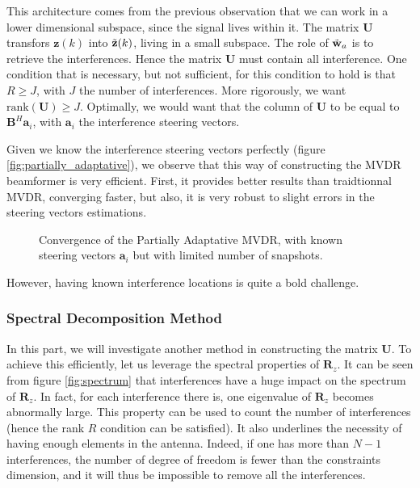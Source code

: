 \documentclass[12pt]{article}
\begin{document}
This architecture comes from the previous observation that we can work in a lower dimensional subspace, since the signal lives within it. The matrix $\mathbf{U}$ transfors $\mathbf{z}(k)$ into $\Tilde{\mathbf{z}}(k)$, living in a small subspace. The role of $\Tilde{\mathbf{w}}_a$ is to retrieve the interferences. Hence the matrix $\mathbf{U}$ must contain all interference. One condition that is necessary, but not sufficient, for this condition to hold is that $R\geq J$, with $J$ the number of interferences. More rigorously, we want $\text{rank}(\mathbf{U}) \geq J$. Optimally, we would want that the column of $\mathbf{U}$ to be equal to $\mathbf{B}^H\mathbf{a}_i$, with $\mathbf{a}_i$ the interference steering vectors.

Given we know the interference steering vectors perfectly (figure \ref{fig:partially_adaptative}), we observe that this way of constructing the MVDR beamformer is very efficient. First, it provides better results than traidtionnal MVDR, converging faster, but also, it is very robust to slight errors in the steering vectors estimations.

\begin{figure}[H]
    \centering
    
    \caption{Convergence of the Partially Adaptative MVDR, with known steering vectors $\mathbf{a}_i$ but with limited number of snapshots.}
    \label{fig:enter-label}
\end{figure}

However, having known interference locations is quite a bold challenge.

\subsubsection{Spectral Decomposition Method}

In this part, we will investigate another method in constructing the matrix $\mathbf{U}$. To achieve this efficiently, let us leverage the spectral properties of $\mathbf{R}_z$. It can be seen from figure \ref{fig:spectrum} that interferences have a huge impact on the spectrum of $\mathbf{R}_z$. In fact, for each interference there is, one eigenvalue of $\mathbf{R}_z$ becomes abnormally large. This property can be used to count the number of interferences (hence the rank $R$ condition can be satisfied). It also underlines the necessity of having enough elements in the antenna. Indeed, if one has more than $N-1$ interferences, the number of degree of freedom is fewer than the constraints dimension, and it will thus be impossible to remove all the interferences. 
\end{document}
